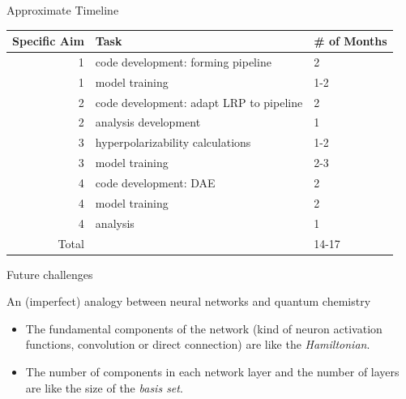 \documentclass[xetex,compress]{beamer}
\begin{document}
\begin{frame}{Approximate Timeline}
\begin{table}[]
\centering
\begin{tabular}{@{}rll@{}}
\toprule
Specific Aim & Task                                    & \# of Months \\ \midrule
1            & code development: forming pipeline      & 2            \\
1            & model training                          & 1-2          \\
2            & code development: adapt LRP to pipeline & 2            \\
2            & analysis development                    & 1            \\
3            & hyperpolarizability calculations        & 1-2          \\
3            & model training                          & 2-3          \\
4            & code development: DAE                   & 2            \\
4            & model training                          & 2            \\
4            & analysis                                & 1            \\ \midrule
Total        &                                         & 14-17        \\ \bottomrule
\end{tabular}
\end{table}\end{frame}

\begin{frame}{Future challenges}
\end{frame}


\begin{frame}{An (imperfect) analogy between neural networks and quantum chemistry}
  \begin{itemize}
  \item The fundamental components of the network (kind of neuron activation functions, convolution or direct connection) are like the \emph{Hamiltonian}.
  \item The number of components in each network layer and the number of layers are like the size of the \emph{basis set}.
  \end{itemize}
\end{frame}
\end{document}
